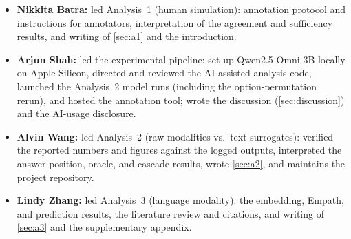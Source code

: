 \documentclass{article}
\begin{document}
\begin{itemize}
  \item \textbf{Nikkita Batra:} led Analysis~1 (human simulation): annotation protocol and instructions
    for annotators, interpretation of the agreement and sufficiency results, and writing of
    \cref{sec:a1} and the introduction.
  \item \textbf{Arjun Shah:} led the experimental pipeline: set up Qwen2.5-Omni-3B locally on Apple
    Silicon, directed and reviewed the AI-assisted analysis code, launched the Analysis~2 model runs
    (including the option-permutation rerun), and hosted the annotation tool; wrote the discussion
    (\cref{sec:discussion}) and the AI-usage disclosure.
  \item \textbf{Alvin Wang:} led Analysis~2 (raw modalities vs.\ text surrogates): verified the
    reported numbers and figures against the logged outputs, interpreted the answer-position, oracle,
    and cascade results, wrote \cref{sec:a2}, and maintains the project repository.
  \item \textbf{Lindy Zhang:} led Analysis~3 (language modality): the embedding, Empath, and
    prediction results, the literature review and citations, and writing of \cref{sec:a3} and the
    supplementary appendix.
\end{itemize}
\end{document}
